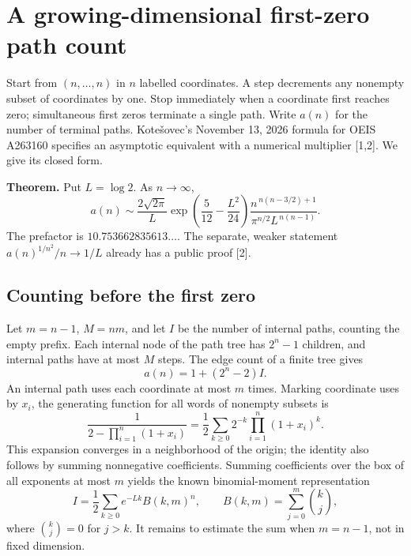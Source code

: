 \documentclass[11pt,a4paper]{article}
\numberwithin{equation}{section}
\theoremstyle{definition}
\theoremstyle{remark}
\begin{document}
\section{\texorpdfstring{A growing-dimensional first-zero path count}{A growing-dimensional first-zero path count}}\label{section:r39taisho}
\par\medskip

Start from $(n,\ldots,n)$ in $n$ labelled coordinates. A step decrements any nonempty subset of coordinates by one. Stop immediately when a coordinate first reaches zero; simultaneous first zeros terminate a single path. Write $a(n)$ for the number of terminal paths. Kote\v{s}ovec's November 13, 2026 formula for OEIS A263160 specifies an asymptotic equivalent with a numerical multiplier [1,2]. We give its closed form.

\textbf{Theorem.} Put $L=\log 2$. As $n\to\infty$,
\[
 a(n)\sim
 \frac{2\sqrt{2\pi}}{L}\exp\!\left(\frac5{12}-\frac{L^2}{24}\right)
 \frac{n^{\,n(n-3/2)+1}}{\pi^{n/2}L^{\,n(n-1)}} .
\]
The prefactor is $10.753662835613\ldots$. The separate, weaker statement $a(n)^{1/n^2}/n\to1/L$ already has a public proof [2].

\subsection*{Counting before the first zero}
Let $m=n-1$, $M=nm$, and let $I$ be the number of internal paths, counting the empty prefix. Each internal node of the path tree has $2^n-1$ children, and internal paths have at most $M$ steps. The edge count of a finite tree gives
\[
 a(n)=1+(2^n-2)I.
\]
An internal path uses each coordinate at most $m$ times. Marking coordinate uses by $x_i$, the generating function for all words of nonempty subsets is
\[
 \frac{1}{2-\prod_{i=1}^n(1+x_i)}
 =\frac12\sum_{k\ge0}2^{-k}\prod_{i=1}^n(1+x_i)^k .
\]
This expansion converges in a neighborhood of the origin; the identity also follows by summing nonnegative coefficients. Summing coefficients over the box of all exponents at most $m$ yields the known binomial-moment representation
\[
 I=\frac12\sum_{k\ge0}e^{-Lk}B(k,m)^n,\qquad
 B(k,m)=\sum_{j=0}^m\binom{k}{j},
\]
where $\binom{k}{j}=0$ for $j>k$. It remains to estimate the sum when $m=n-1$, not in fixed dimension.
\end{document}

